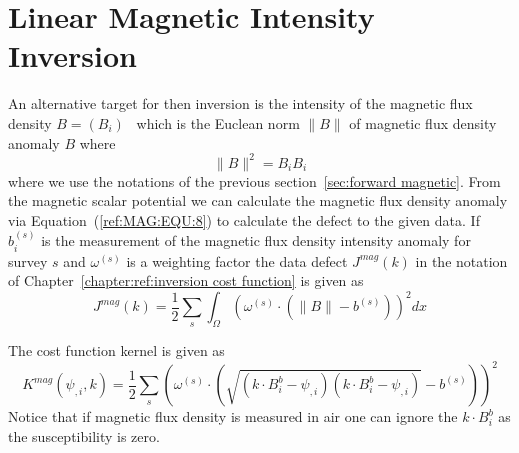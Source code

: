 
%
%
%


\section{Linear Magnetic Intensity Inversion}\label{sec:forward magnetic intensity}
An alternative target for then inversion is the intensity of the magnetic flux
density $B=(B_i)$~ which is the Euclean norm $\|B\|$ of magnetic
flux density anomaly $B$ where 
\begin{equation}\label{ref:IMAG:EQU:1}
\|B\|^2 =  B_i B_i
\end{equation}
where we use the notations of the previous section~\ref{sec:forward magnetic}.   
From the magnetic scalar potential we can calculate the magnetic flux density
anomaly via Equation~(\ref{ref:MAG:EQU:8}) to calculate the defect to the given data.
If $b^{(s)}_i$ is the measurement of the magnetic flux density intensity anomaly for
survey $s$ and $\omega^{(s)}$ is a weighting factor the data defect
$J^{mag}(k)$ in the notation of Chapter~\ref{chapter:ref:inversion cost function} is given as
\begin{equation}\label{ref:IMAG:EQU:9}
J^{mag}(k) = \frac{1}{2}\sum_{s} \int_{\Omega} \left( \omega^{(s)} \cdot (\|B\|- b^{(s)} )\right)^2 dx
\end{equation} 

The cost function kernel is given as
\begin{equation}\label{ref:IMAG:EQU:10}
K^{mag}(\psi_{,i},k) = \frac{1}{2}\sum_{s} \left( \omega^{(s)} \cdot (\sqrt{(k \cdot B^b_i - \psi_{,i})(k \cdot B^b_i - \psi_{,i})} - b^{(s)}) \right)^2
\end{equation} 
Notice that if magnetic flux density is measured in air one can ignore the
$k\cdot B^b_i$ as the susceptibility is zero.

